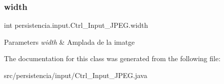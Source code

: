 \subsubsection{\texorpdfstring{width}{width}}
{\footnotesize\ttfamily int persistencia.\+input.\+Ctrl\+\_\+\+Input\+\_\+\+J\+P\+E\+G.\+width\hspace{0.3cm}{\ttfamily [package]}}


\begin{DoxyParams}{Parameters}
{\em width} & Amplada de la imatge \\
\hline
\end{DoxyParams}


The documentation for this class was generated from the following file\+:\begin{DoxyCompactItemize}
\item 
src/persistencia/input/Ctrl\+\_\+\+Input\+\_\+\+J\+P\+E\+G.\+java\end{DoxyCompactItemize}
